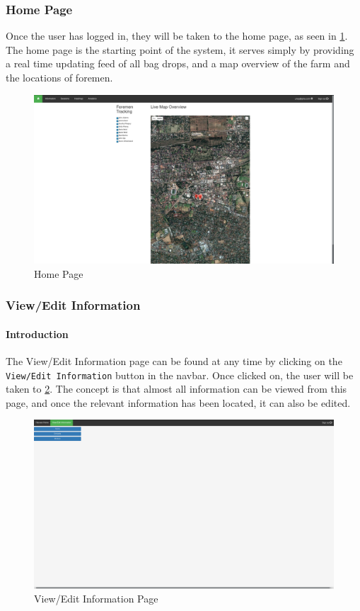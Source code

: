 \documentclass[11pt]{article}
\begin{document}
\subsubsection{Home Page}
\label{webHome}
Once the user has logged in, they will be taken to the home page, as seen in \ref{HomePage}. The home page is the starting point of the system, it serves simply by providing a real time updating feed of all bag drops, and a map overview of the farm and the locations of foremen.

\begin{figure}
 \centering
 \includegraphics[width=12cm, keepaspectratio]{Images/webHome-Page.png}
 \caption{Home Page}
 \label{HomePage}
\end{figure}

\subsubsection{View/Edit Information}
\label{webInformation}
\paragraph{Introduction}The View/Edit Information page can be found at any time by clicking on the \texttt{View/Edit Information} button in the navbar. Once clicked on, the user will be taken to \ref{InformationPage}. The concept is that almost all information can be viewed from this page, and once the relevant information has been located, it can also be edited.

\begin{figure}
 \centering
 \includegraphics[width=12cm, keepaspectratio]{Images/webInformation-Page.png}
 \caption{View/Edit Information Page}
 \label{InformationPage}
\end{figure}
\end{document}
